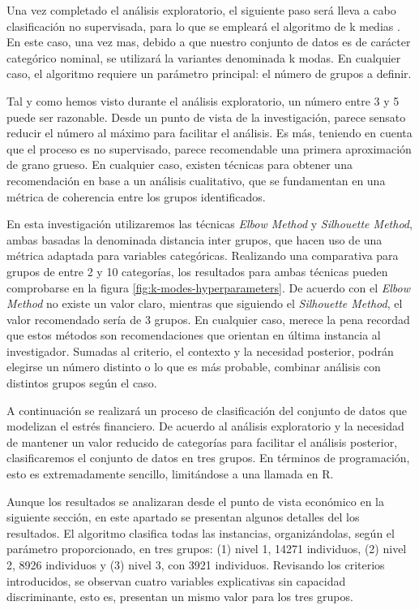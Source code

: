 \documentclass[a4paper, 11pt]{article}
\begin{document}
Una vez completado el análisis exploratorio, el siguiente paso será lleva a cabo 
clasificación no supervisada, para lo que se empleará el algoritmo de k medias
\cite{Hastie23}. En este caso, una vez mas, debido a que nuestro conjunto
de datos es de carácter categórico nominal, se utilizará la variantes denominada
k modas. En cualquier caso, el algoritmo requiere un parámetro principal: el número
de grupos a definir. 

Tal y como hemos visto durante el análisis exploratorio, un 
número entre 3 y 5 puede ser razonable. Desde un punto de vista de la investigación, 
parece sensato reducir el número al máximo para facilitar el análisis. Es más, teniendo
en cuenta que el proceso es no supervisado, parece recomendable una primera aproximación 
de grano grueso. En cualquier caso, existen técnicas para obtener una recomendación en
base a un análisis cualitativo, que se fundamentan en una métrica de coherencia entre
los grupos identificados. 

En esta investigación utilizaremos las técnicas \textit{Elbow Method} y \textit{Silhouette Method},
ambas basadas la denominada distancia inter grupos, que hacen uso de una métrica adaptada 
para variables categóricas. Realizando una comparativa para grupos de entre 2 y 10 categorías, 
los resultados para ambas técnicas pueden comprobarse en la figura \ref{fig:k-modes-hyperparameters}. De acuerdo con el \textit{Elbow Method} no existe un valor claro,
mientras que siguiendo el \textit{Silhouette Method}, el valor recomendado sería de 3 grupos.
En cualquier caso, merece la pena recordad que estos métodos son recomendaciones que 
orientan en última instancia al investigador. Sumadas al criterio, el contexto y la necesidad
posterior, podrán elegirse un número distinto o lo que es más probable, combinar análisis
con distintos grupos según el caso.

A continuación se realizará un proceso de clasificación del conjunto de datos que modelizan
el estrés financiero. De acuerdo al análisis exploratorio y la necesidad de mantener un
valor reducido de categorías para facilitar el análisis posterior, clasificaremos el 
conjunto de datos en tres grupos. En términos de programación, esto es extremadamente
sencillo, limitándose a una llamada en R.

Aunque los resultados se analizaran desde el punto de vista económico en la siguiente sección,
en este apartado se presentan algunos detalles del los resultados. El algoritmo clasifica
todas las instancias, organizándolas, según el parámetro proporcionado, en tres grupos:
(1) nivel 1, 14271 individuos, (2) nivel 2, 8926 individuos y (3) nivel 3, con 3921 
individuos. Revisando los criterios introducidos, se observan cuatro variables explicativas
sin capacidad discriminante, esto es, presentan un mismo valor para los tres grupos. 
\end{document}
